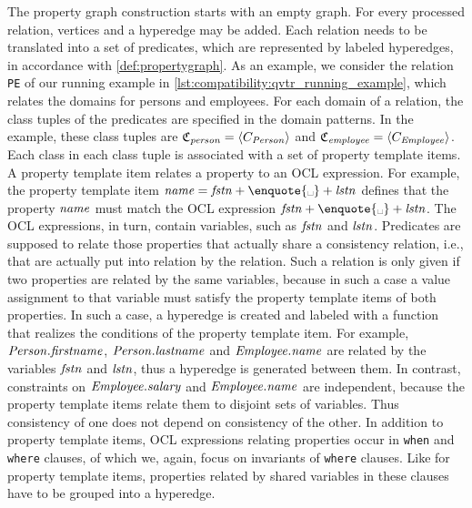 The property graph construction starts with an empty graph.
For every processed \qvtr relation, vertices and a hyperedge may be added.
Each \qvtr relation needs to be translated into a set of predicates, which are represented by labeled hyperedges, in accordance with \autoref{def:propertygraph}.
As an example, we consider the relation \texttt{PE} of our running example in \autoref{lst:compatibility:qvtr_running_example}, which relates the domains for persons and employees.
For each domain of a relation, the class tuples of the predicates are specified in the domain patterns.
In the example, these class tuples are $\classtuple{C}{\mathvariable{person}} = \tupled{\class{C}{\mathvariable{Person}}}$ and $\classtuple{C}{\mathvariable{employee}} = \tupled{\class{C}{\mathvariable{Employee}}}$.
Each class in each class tuple is associated with a set of property template items.
A property template item relates a property to an OCL expression. 
For example, the property template item $\mathvariable{name} = \mathvariable{fstn} + \text{\enquote{\textvisiblespace}} + \mathvariable{lstn}$ defines that the property $\mathit{name}$ must match the OCL expression $\mathvariable{fstn} + \text{\enquote{\textvisiblespace}} + \mathvariable{lstn}$.
The OCL expressions, in turn, contain \qvtr variables, such as $\mathit{fstn}$ and $\mathit{lstn}$.
Predicates are supposed to relate those properties that actually share a consistency relation, i.e., that are actually put into relation by the \qvtr relation.
Such a relation is only given if two properties are related by the same \qvtr variables, because in such a case a value assignment to that variable must satisfy the property template items of both properties.
In such a case, a hyperedge is created and labeled with a function that realizes the conditions of the property template item.
For example, $\mathit{Person.firstname}$, $\mathit{Person.lastname}$ and $\mathit{Employee.name}$ are related by the \qvtr variables $\mathit{fstn}$ and $\mathit{lstn}$, thus a hyperedge is generated between them.
In contrast, constraints on $\mathit{Employee.salary}$ and $\mathit{Employee.name}$ are independent, because the property template items relate them to disjoint sets of \qvtr variables. %
Thus consistency of one does not depend on consistency of the other.
In addition to property template items, OCL expressions relating properties occur in \texttt{when} and \texttt{where} clauses, of which we, again, focus on invariants of \texttt{where} clauses.
Like for property template items, properties related by shared \qvtr variables in these clauses have to be grouped into a hyperedge.

